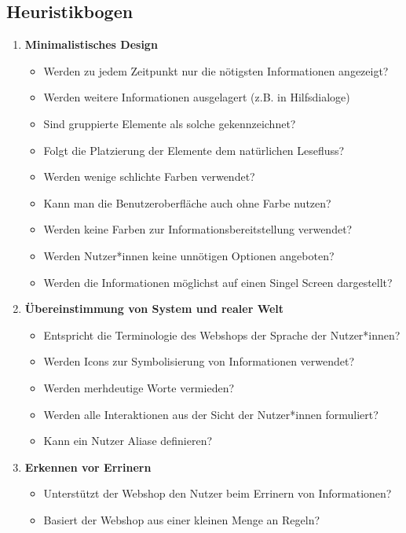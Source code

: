 \documentclass[utf8,biblatex]{lni}
\begin{document}
\newpage
\begin{appendices}
\section{Heuristikbogen}\label{sec:Heuristikbogen}
\begin{enumerate}
  \item \textbf{Minimalistisches Design}
  \begin{itemize}
    \item Werden zu jedem Zeitpunkt nur die nötigsten Informationen angezeigt?
    \item Werden weitere Informationen ausgelagert (z.B. in Hilfsdialoge)
    \item Sind gruppierte Elemente als solche gekennzeichnet?
    \item Folgt die Platzierung der Elemente dem natürlichen Lesefluss?
    \item Werden wenige schlichte Farben verwendet?
    \item Kann man die Benutzeroberfläche auch ohne Farbe nutzen?
    \item Werden keine Farben zur Informationsbereitstellung verwendet?
    \item Werden Nutzer*innen keine unnötigen Optionen angeboten?
    \item Werden die Informationen möglichst auf einen Singel Screen dargestellt?
  \end{itemize}
  \item \textbf{Übereinstimmung von System und realer Welt}
  \begin{itemize}
    \item Entspricht die Terminologie des Webshops der Sprache der Nutzer*innen?
    \item Werden Icons zur Symbolisierung von Informationen verwendet?
    \item Werden merhdeutige Worte vermieden?
    \item Werden alle Interaktionen aus der Sicht der Nutzer*innen formuliert?
    \item Kann ein Nutzer Aliase definieren?
  \end{itemize}
  \item \textbf{Erkennen vor Errinern}
  \begin{itemize}
    \item Unterstützt der Webshop den Nutzer beim Errinern von Informationen?
    \item Basiert der Webshop aus einer kleinen Menge an Regeln?

\end{itemize}
\end{enumerate}
\end{appendices}
\end{document}
